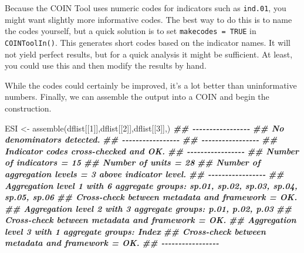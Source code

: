 \documentclass[
]{book}
\newenvironment{Shaded}{\begin{snugshade}}{\end{snugshade}}
\newcommand{\AttributeTok}[1]{\textcolor[rgb]{0.77,0.63,0.00}{#1}}
\newcommand{\ConstantTok}[1]{\textcolor[rgb]{0.00,0.00,0.00}{#1}}
\newcommand{\DecValTok}[1]{\textcolor[rgb]{0.00,0.00,0.81}{#1}}
\newcommand{\DocumentationTok}[1]{\textcolor[rgb]{0.56,0.35,0.01}{\textbf{\textit{#1}}}}
\newcommand{\FunctionTok}[1]{\textcolor[rgb]{0.00,0.00,0.00}{#1}}
\newcommand{\NormalTok}[1]{#1}
\newcommand{\OtherTok}[1]{\textcolor[rgb]{0.56,0.35,0.01}{#1}}
\newcommand{\SpecialCharTok}[1]{\textcolor[rgb]{0.00,0.00,0.00}{#1}}
\begin{document}
Because the COIN Tool uses numeric codes for indicators such as \texttt{ind.01}, you might want slightly more informative codes. The best way to do this is to name the codes yourself, but a quick solution is to set \texttt{makecodes\ =\ TRUE} in \texttt{COINToolIn()}. This generates short codes based on the indicator names. It will not yield perfect results, but for a quick analysis it might be sufficient. At least, you could use this and then modify the results by hand.

\begin{Shaded}
\end{Shaded}

While the codes could certainly be improved, it's a lot better than uninformative numbers. Finally, we can assemble the output into a COIN and begin the construction.

\begin{Shaded}
\begin{Highlighting}[]
\NormalTok{ESI }\OtherTok{\textless{}{-}} \FunctionTok{assemble}\NormalTok{(dflist[[}\DecValTok{1}\NormalTok{]],dflist[[}\DecValTok{2}\NormalTok{]],dflist[[}\DecValTok{3}\NormalTok{]],)}
\DocumentationTok{\#\# {-}{-}{-}{-}{-}{-}{-}{-}{-}{-}{-}{-}{-}{-}{-}{-}{-}}
\DocumentationTok{\#\# No denominators detected.}
\DocumentationTok{\#\# {-}{-}{-}{-}{-}{-}{-}{-}{-}{-}{-}{-}{-}{-}{-}{-}{-}}
\DocumentationTok{\#\# {-}{-}{-}{-}{-}{-}{-}{-}{-}{-}{-}{-}{-}{-}{-}{-}{-}}
\DocumentationTok{\#\# Indicator codes cross{-}checked and OK.}
\DocumentationTok{\#\# {-}{-}{-}{-}{-}{-}{-}{-}{-}{-}{-}{-}{-}{-}{-}{-}{-}}
\DocumentationTok{\#\# Number of indicators = 15}
\DocumentationTok{\#\# Number of units = 28}
\DocumentationTok{\#\# Number of aggregation levels = 3 above indicator level.}
\DocumentationTok{\#\# {-}{-}{-}{-}{-}{-}{-}{-}{-}{-}{-}{-}{-}{-}{-}{-}{-}}
\DocumentationTok{\#\# Aggregation level 1 with 6 aggregate groups: sp.01, sp.02, sp.03, sp.04, sp.05, sp.06}
\DocumentationTok{\#\# Cross{-}check between metadata and framework = OK.}
\DocumentationTok{\#\# Aggregation level 2 with 3 aggregate groups: p.01, p.02, p.03}
\DocumentationTok{\#\# Cross{-}check between metadata and framework = OK.}
\DocumentationTok{\#\# Aggregation level 3 with 1 aggregate groups: Index}
\DocumentationTok{\#\# Cross{-}check between metadata and framework = OK.}
\DocumentationTok{\#\# {-}{-}{-}{-}{-}{-}{-}{-}{-}{-}{-}{-}{-}{-}{-}{-}{-}}
\end{Highlighting}
\end{Shaded}
\end{document}
